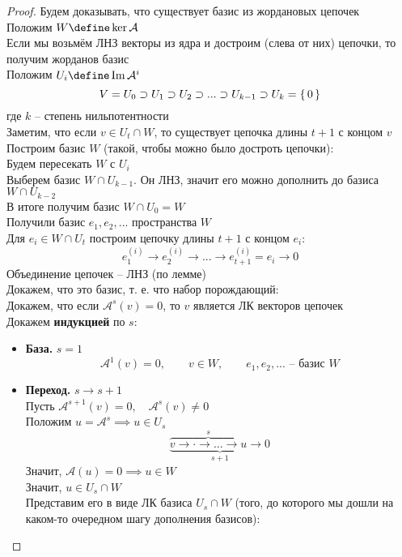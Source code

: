 \begin{proof}
	Будем доказывать, что существует базис из жордановых цепочек \\
	Положим $ W \define \ker \mathcal{A} $ \\
	Если мы возьмём ЛНЗ векторы из ядра и достроим (слева от них) цепочки, то получим жорданов базис \\
	Положим $ U_i \define \Img \mathcal{A}^i $
	$$ V = U_0 \supset U_1 \supset U_2 \supset ... \supset U_{k - 1} \supset U_k = \set{0} $$
	где $ k $ -- степень нильпотентности \\
	Заметим, что если $ v \in U_t \cap W $, то существует цепочка длины $ t + 1 $ с концом $ v $ \\
	Построим базис $ W $ (такой, чтобы можно было достроть цепочки): \\
	Будем пересекать $ W $ с $ U_i $ \\
	Выберем базис $ W \cap U_{k - 1} $. Он ЛНЗ, значит его можно дополнить до базиса $ W \cap U_{k - 2} $ \\
	В итоге получим базис $ W \cap U_0 = W $ \\
	Получили базис $ e_1, e_2, ... $ пространства $ W $ \\
	Для $ e_i \in W \cap U_t $ построим цепочку длины $ t + 1 $ с концом $ e_i $:
	$$ e_1^{(i)} \to e_2^{(i)} \to ... \to e_{t + 1}^{(i)} = e_i \to 0 $$
	Объединение цепочек -- ЛНЗ (по лемме) \\
	Докажем, что это базис, т. е. что набор порождающий: \\
	Докажем, что если $ \mathcal{A}^s(v) = 0 $, то $ v $ является ЛК векторов цепочек \\
	Докажем \textbf{индукцией} по $ s $:
	\begin{itemize}
		\item \textbf{База.} $ s = 1 $
		$$ \mathcal{A}^1(v) = 0, \qquad v \in W, \qquad e_1, e_2, ... \text{ -- базис } W $$
		\item \textbf{Переход.} $ s \to s + 1 $ \\
		Пусть $ \mathcal{A}^{s + 1}(v) = 0, \quad \mathcal{A}^s(v) \ne 0 $ \\
		Положим $ u = \mathcal{A}^s \implies u \in U_s $
		$$ \underbrace{\overbrace{v \to \cdot \to ... \to u}^s \to 0}_{s + 1} $$
		Значит, $ \mathcal{A}(u) = 0 \implies u \in W $ \\
		Значит, $ u \in U_s \cap W $ \\
		Представим его в виде ЛК базиса $ U_s \cap W $ (того, до которого мы дошли на каком-то очередном шагу дополнения базисов):

\end{itemize}
\end{proof}
